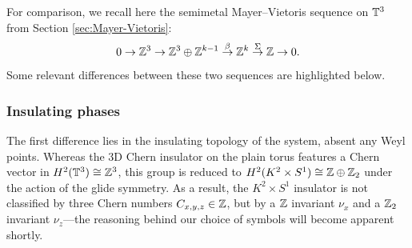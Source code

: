 For comparison, we recall here the semimetal Mayer--Vietoris sequence on $\mathbb{T}^3$ from Section \ref{sec:Mayer-Vietoris}:
\begin{equation}\label{eq:semimetal-MV-explicit-again}
	0 \to \mathbb{Z}^3 \to \mathbb{Z}^3\oplus\mathbb{Z}^{k-1} \overset{\beta}{\to} \mathbb{Z}^k \overset{\Sigma}{\to} \mathbb{Z} \to 0.
\end{equation}
Some relevant differences between these two sequences are highlighted below.

\subsubsection{Insulating phases}

The first difference lies in the insulating topology of the system, absent any Weyl points. Whereas the 3D Chern insulator on the plain torus features a Chern vector in $H^2(\mathbb{T}^3)\cong\mathbb{Z}^3$, this group is reduced to $H^2(K^2\times S^1)\cong\mathbb{Z}\oplus\mathbb{Z}_2$ under the action of the glide symmetry. As a result, the $K^2\times S^1$ insulator is not classified by three Chern numbers $C_{x,y,z}\in\mathbb{Z}$, but by a $\mathbb{Z}$ invariant $\nu_x$ and a $\mathbb{Z}_2$ invariant $\nu_z$---the reasoning behind our choice of symbols will become apparent shortly.

